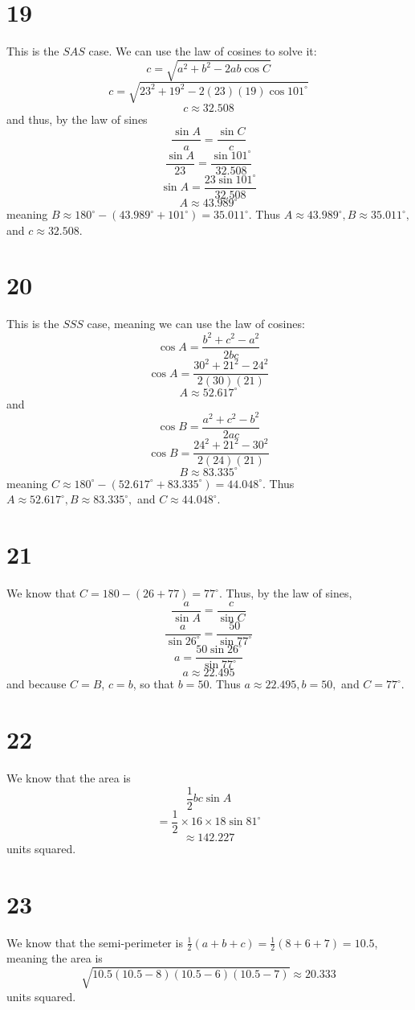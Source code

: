 \documentclass{article}
\theoremstyle{definition}
\newcommand{\?}{\stackrel{?}{=}}
\begin{document}
\section*{19}
This is the $SAS$ case. We can use the law of cosines to solve it:
\[ c=\sqrt{a^2+b^2-2ab\cos C} \]
\[ c=\sqrt{23^2+19^2-2(23)(19)\cos 101^\circ} \]
\[ c\approx 32.508 \]
and thus, by the law of sines
\[ \frac{\sin A}{a}=\frac{\sin C}{c} \]
\[ \frac{\sin A}{23}=\frac{\sin 101^\circ}{32.508} \]
\[ \sin A=\frac{23\sin 101^\circ}{32.508} \]
\[ A\approx 43.989^\circ \] meaning $B\approx 180^\circ-(43.989^\circ+101^\circ)=35.011^\circ$. Thus
$A\approx 43.989^\circ,B\approx 35.011^\circ,$ and $c\approx 32.508$.

\section*{20}
This is the $SSS$ case, meaning we can use the law of cosines:
\[ \cos A=\frac{b^2+c^2-a^2}{2bc} \]
\[ \cos A=\frac{30^2+21^2-24^2}{2(30)(21)} \]
\[ A\approx 52.617^\circ \]
and
\[ \cos B=\frac{a^2+c^2-b^2}{2ac} \]
\[ \cos B=\frac{24^2+21^2-30^2}{2(24)(21)} \]
\[ B\approx 83.335^\circ \]
meaning $C\approx 180^\circ-(52.617^\circ+83.335^\circ)=44.048^\circ$. Thus
$A\approx 52.617^\circ,B\approx 83.335^\circ,$ and $C\approx 44.048^\circ$.

\section*{21}
We know that $C=180-(26+77)=77^\circ$. Thus, by the law of sines,
\[ \frac{a}{\sin A}=\frac{c}{\sin C} \]
\[ \frac{a}{\sin 26^\circ}=\frac{50}{\sin 77^\circ} \]
\[ a=\frac{50\sin 26^\circ}{\sin 77^\circ} \]
\[ a\approx 22.495 \]
and because $C=B$, $c=b$, so that $b=50$. Thus
$a\approx 22.495,b=50,$ and $C=77^\circ$.

\section*{22}
We know that the area is
\[ \frac{1}{2}bc\sin A \]
\[ =\frac{1}{2}\times 16\times 18\sin 81^\circ \]
\[ \approx 142.227 \] units squared.

\section*{23}
We know that the semi-perimeter is $\frac{1}{2}(a+b+c)=\frac{1}{2}(8+6+7)=10.5$, meaning the area is
\[ \sqrt{10.5(10.5-8)(10.5-6)(10.5-7)}\approx 20.333 \] units squared.
\end{document}
